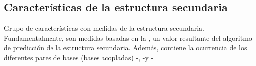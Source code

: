 %
%
\subsection{Características de la estructura secundaria}
%
Grupo de características con medidas de la estructura secundaria.
Fundamentalmente, son medidas basadas en la ,
un valor resultante del algoritmo de predicción de la estructura
secundaria.  Además, contiene la ocurrencia de los diferentes pares de
bases (bases acopladas) \ntA-\ntU, \ntG-\ntC y \ntG-\ntU.
